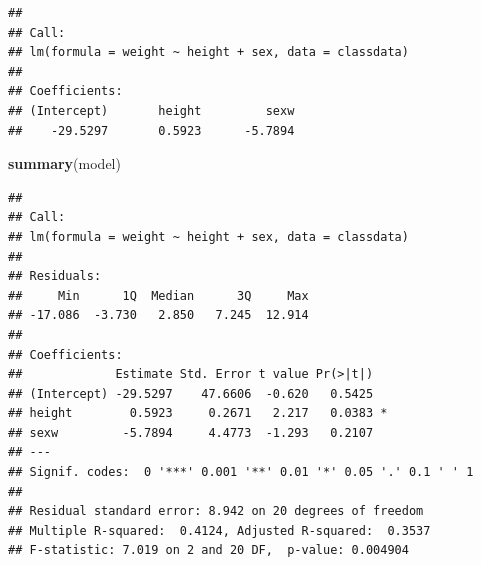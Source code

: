 \documentclass[
  doc]{apa6}
\newenvironment{Shaded}{\begin{snugshade}}{\end{snugshade}}
\newcommand{\DecValTok}[1]{\textcolor[rgb]{0.00,0.00,0.81}{#1}}
\newcommand{\FunctionTok}[1]{\textcolor[rgb]{0.13,0.29,0.53}{\textbf{#1}}}
\newcommand{\NormalTok}[1]{#1}
\newcommand{\OtherTok}[1]{\textcolor[rgb]{0.56,0.35,0.01}{#1}}
\newcommand{\SpecialCharTok}[1]{\textcolor[rgb]{0.81,0.36,0.00}{\textbf{#1}}}
\begin{document}
\begin{verbatim}
## 
## Call:
## lm(formula = weight ~ height + sex, data = classdata)
## 
## Coefficients:
## (Intercept)       height         sexw  
##    -29.5297       0.5923      -5.7894
\end{verbatim}

\begin{Shaded}
\end{Shaded}

\begin{Shaded}
\begin{Highlighting}[]
\FunctionTok{summary}\NormalTok{(model)}
\end{Highlighting}
\end{Shaded}

\begin{verbatim}
## 
## Call:
## lm(formula = weight ~ height + sex, data = classdata)
## 
## Residuals:
##     Min      1Q  Median      3Q     Max 
## -17.086  -3.730   2.850   7.245  12.914 
## 
## Coefficients:
##             Estimate Std. Error t value Pr(>|t|)  
## (Intercept) -29.5297    47.6606  -0.620   0.5425  
## height        0.5923     0.2671   2.217   0.0383 *
## sexw         -5.7894     4.4773  -1.293   0.2107  
## ---
## Signif. codes:  0 '***' 0.001 '**' 0.01 '*' 0.05 '.' 0.1 ' ' 1
## 
## Residual standard error: 8.942 on 20 degrees of freedom
## Multiple R-squared:  0.4124, Adjusted R-squared:  0.3537 
## F-statistic: 7.019 on 2 and 20 DF,  p-value: 0.004904
\end{verbatim}

\newpage
\end{document}
